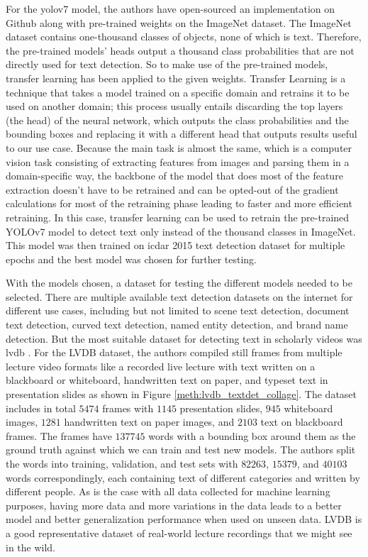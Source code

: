 For the \gls{yolov7} model, the authors have open-sourced an implementation on Github\cite{wong_official_2023} along with pre-trained weights on the ImageNet dataset. The ImageNet dataset contains one-thousand classes of objects, none of which is text. Therefore, the pre-trained models' heads output a thousand class probabilities that are not directly used for text detection. So to make use of the pre-trained models, transfer learning has been applied to the given weights. Transfer Learning is a technique that takes a model trained on a specific domain and retrains it to be used on another domain; this process usually entails discarding the top layers (the head) of the neural network, which outputs the class probabilities and the bounding boxes and replacing it with a different head that outputs results useful to our use case. Because the main task is almost the same, which is a computer vision task consisting of extracting features from images and parsing them in a domain-specific way, the backbone of the model that does most of the feature extraction doesn't have to be retrained and can be opted-out of the gradient calculations for most of the retraining phase leading to faster and more efficient retraining. In this case, transfer learning can be used to retrain the pre-trained YOLOv7 model to detect text only instead of the thousand classes in ImageNet. This model was then trained on \gls{icdar} 2015 text detection dataset for multiple epochs and the best model was chosen for further testing.

With the models chosen, a dataset for testing the different models needed to be selected. There are multiple available text detection datasets on the internet for different use cases, including but not limited to scene text detection, document text detection, curved text detection, named entity detection, and brand name detection. But the most suitable dataset for detecting text in scholarly videos was \gls{lvdb} \cite{dutta_localizing_2018}. For the LVDB dataset, the authors compiled still frames from multiple lecture video formats like a recorded live lecture with text written on a blackboard or whiteboard, handwritten text on paper, and typeset text in presentation slides as shown in Figure \ref{meth:lvdb_textdet_collage}. The dataset includes in total $5474$ frames with $1145$ presentation slides, $945$ whiteboard images, $1281$ handwritten text on paper images, and $2103$ text on blackboard frames. The frames have $137745$ words with a bounding box around them as the ground truth against which we can train and test new models. The authors split the words into training, validation, and test sets with $82263$, $15379$, and $40103$ words correspondingly, each containing text of different categories and written by different people. As is the case with all data collected for machine learning purposes, having more data and more variations in the data leads to a better model and better generalization performance when used on unseen data. LVDB is a good representative dataset of real-world lecture recordings that we might see in the wild.

